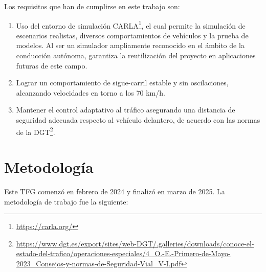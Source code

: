 Los requisitos que han de cumplirse en este trabajo son:
\begin{enumerate}
\item Uso del entorno de simulación CARLA\footnote{\url{https://carla.org/}}, el cual permite la simulación de escenarios realistas, diversos comportamientos de vehículos y la prueba de modelos. Al ser un simulador ampliamente reconocido en el ámbito de la conducción autónoma, garantiza la reutilización del proyecto en aplicaciones futuras de este campo.
\item Lograr un comportamiento de sigue-carril estable y sin oscilaciones, alcanzando velocidades en torno a los 70 km/h.
\item Mantener el control adaptativo al tráfico asegurando una distancia de seguridad adecuada respecto al vehículo delantero, de acuerdo con las normas de la \ac{DGT}\footnote{\url{https://www.dgt.es/export/sites/web-DGT/.galleries/downloads/conoce-el-estado-del-trafico/operaciones-especiales/4_O.-E.-Primero-de-Mayo-2023_Consejos-y-normas-de-Seguridad-Vial_V-I.pdf}}.
\end{enumerate}

\section{Metodología}
\label{sec:metodologia}

Este TFG comenzó en febrero de 2024 y finalizó en marzo de 2025. La metodología de trabajo fue la siguiente:

